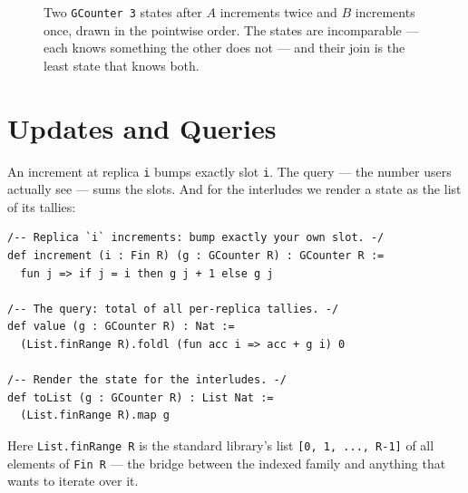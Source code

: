 \documentclass[12pt, a4paper, openright]{book}
\theoremstyle{thmstyle}
\theoremstyle{defstyle}
\newcommand{\lc}[1]{\texttt{#1}}
\begin{document}
\begin{figure}[h]
  \centering
  \caption{Two \lc{GCounter 3} states after $A$ increments twice and $B$
           increments once, drawn in the pointwise order. The states are
           incomparable --- each knows something the other does not ---
           and their join is the least state that knows both.}
\end{figure}

\section{Updates and Queries}

An increment at replica \lc{i} bumps exactly slot \lc{i}. The query ---
the number users actually see --- sums the slots. And for the interludes
we render a state as the list of its tallies:

\begin{verbatim}
/-- Replica `i` increments: bump exactly your own slot. -/
def increment (i : Fin R) (g : GCounter R) : GCounter R :=
  fun j => if j = i then g j + 1 else g j

/-- The query: total of all per-replica tallies. -/
def value (g : GCounter R) : Nat :=
  (List.finRange R).foldl (fun acc i => acc + g i) 0

/-- Render the state for the interludes. -/
def toList (g : GCounter R) : List Nat :=
  (List.finRange R).map g
\end{verbatim}

Here \lc{List.finRange R} is the standard library's list
\lc{[0, 1, ..., R-1]} of all elements of \lc{Fin R} --- the bridge
between the indexed family and anything that wants to iterate over it.
\end{document}
